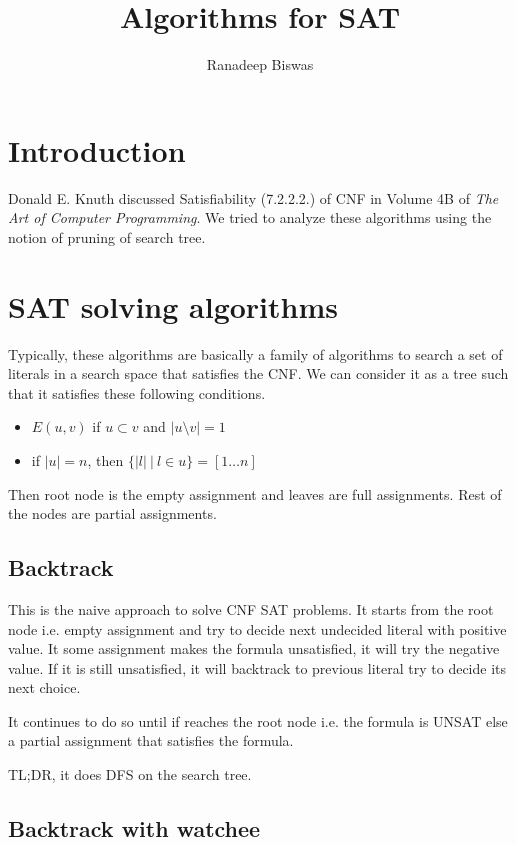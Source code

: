 \documentclass[a4paper]{article}
\title{Algorithms for SAT}
\author{Ranadeep Biswas}
\date{}
\begin{document}
\maketitle

\section{Introduction}
Donald E. Knuth discussed Satisfiability (7.2.2.2.) of CNF in Volume 4B of \emph{The Art of Computer Programming}. We tried to analyze these algorithms using the notion of pruning of search tree.

\section{SAT solving algorithms}

Typically, these algorithms are basically a family of algorithms to search a set of literals in a search space that satisfies the CNF. We can consider it as a tree such that it satisfies these following conditions.

\begin{itemize}
\item $E(u, v)$ if $u \subset v$ and $|u \setminus v| = 1$
\item if $|u| = n$, then $\{|l|\ |\ l \in u\} = [1\ldots n]$
\end{itemize}

Then root node is the empty assignment and leaves are full assignments. Rest of the nodes are partial assignments.

\subsection{Backtrack}

This is the naive approach to solve CNF SAT problems. It starts from the root node i.e. empty assignment and try to decide next undecided literal with positive value. It some assignment makes the formula unsatisfied, it will try the negative value. If it is still unsatisfied, it will backtrack to previous literal try to decide its next choice.

It continues to do so until if reaches the root node i.e. the formula is UNSAT else a partial assignment that satisfies the formula.

TL;DR, it does DFS on the search tree.

\subsection{Backtrack with watchee}
\end{document}
